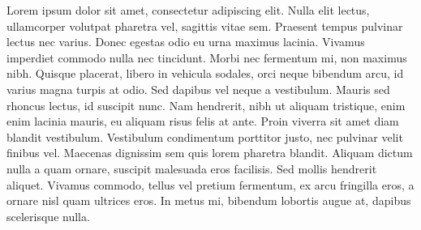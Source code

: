 Lorem ipsum dolor sit amet, consectetur adipiscing elit. Nulla elit lectus, ullamcorper volutpat pharetra vel, sagittis vitae sem. Praesent tempus pulvinar lectus nec varius. Donec egestas odio eu urna maximus lacinia. Vivamus imperdiet commodo nulla nec tincidunt. Morbi nec fermentum mi, non maximus nibh. Quisque placerat, libero in vehicula sodales, orci neque bibendum arcu, id varius magna turpis at odio. Sed dapibus vel neque a vestibulum. Mauris sed rhoncus lectus, id suscipit nunc. Nam hendrerit, nibh ut aliquam tristique, enim enim lacinia mauris, eu aliquam risus felis at ante. Proin viverra sit amet diam blandit vestibulum. Vestibulum condimentum porttitor justo, nec pulvinar velit finibus vel. Maecenas dignissim sem quis lorem pharetra blandit. Aliquam dictum nulla a quam ornare, suscipit malesuada eros facilisis. Sed mollis hendrerit aliquet. Vivamus commodo, tellus vel pretium fermentum, ex arcu fringilla eros, a ornare nisl quam ultrices eros. In metus mi, bibendum lobortis augue at, dapibus scelerisque nulla.